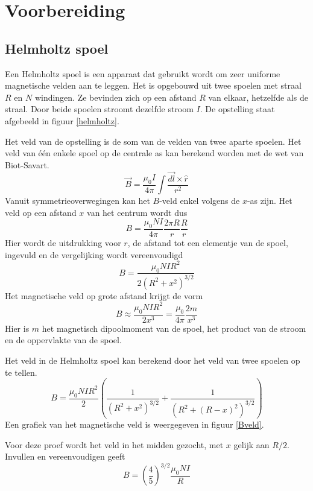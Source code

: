 \section{Voorbereiding}

\subsection{Helmholtz spoel}

Een Helmholtz spoel is een apparaat dat gebruikt wordt om zeer uniforme 
magnetische velden aan te leggen. Het is opgebouwd uit twee spoelen met straal 
$R$ en $N$ windingen. Ze bevinden zich op een afstand $R$ van elkaar,
hetzelfde als de straal. Door beide spoelen stroomt dezelfde stroom $I$. De 
opstelling staat afgebeeld in figuur \ref{helmholtz}.


Het veld van de opstelling is de som van de velden van twee aparte spoelen. Het 
veld van \'e\'en enkele spoel op de centrale as kan berekend worden met de wet 
van Biot-Savart.
$$
\vec{B} = \frac{\mu_0 I}{4 \pi} \int \frac{\vec{dl} \times \hat{r}}{r^2}
$$
Vanuit symmetrieoverwegingen kan het $B$-veld enkel volgens de $x$-as zijn. Het 
veld op een afstand $x$ van het centrum wordt dus
$$
B = \frac{\mu_0 NI}{4 \pi} \frac{2 \pi R}{r} \frac{R}{r}
$$
Hier wordt de uitdrukking voor $r$, de afstand tot een elementje van de spoel, 
ingevuld en de vergelijking wordt vereenvoudigd
$$
B = \frac{\mu_0 NI R^2}{2(R^2+x^2)^{3/2}}
$$
Het magnetische veld op grote afstand krijgt de vorm
$$
B \approx \frac{\mu_0 NI R^2}{2x^3} = \frac{\mu_0}{4 \pi}\frac{2m}{x^3}
$$
Hier is $m$ het magnetisch dipoolmoment van de spoel, het product van de stroom 
en de oppervlakte van de spoel.

Het veld in de Helmholtz spoel kan berekend door het veld van twee spoelen op 
te tellen.
$$
B = \frac{\mu_0 NI R^2}{2}\left( \frac{1}{(R^2+x^2)^{3/2}} + 
\frac{1}{(R^2+(R-x)^2)^{3/2}} \right)
$$
Een grafiek van het magnetische veld is weergegeven in figuur \ref{Bveld}.

Voor deze proef wordt het veld in het midden gezocht, met $x$ gelijk aan $R/2$.
Invullen en vereenvoudigen geeft
\begin{equation}
\label{Helmholtz-eq}
B = \left(\frac{4}{5}\right)^{3/2} \frac{\mu_0 NI}{R}
\end{equation}


